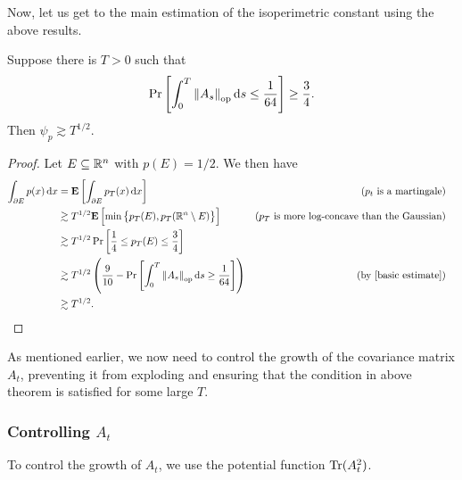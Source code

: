 		Now, let us get to the main estimation of the isoperimetric constant using the above results.

		\begin{ftheo}
			\label{lee-vem: isoperimetric using time}
			Suppose there is $T > 0$ such that
			\[ \Pr\left[\int_0^T \left\lVert A_s\right\rVert_{\text{op}} \operatorname{d}\!{s} \leq \frac{1}{64} \right] \geq \frac{3}{4}. \]
			Then $\psi_p \gtrsim T^{1/2}$.
		\end{ftheo}
		\begin{proof}
			Let $E\subseteq\mathbb{R}^n$ with $p(E) = 1/2$.
			We then have
			\begin{align*}
				\int_{\partial E} p(x) \d{x} &= \expec\left[ \int_{\partial E} p_T(x)\d{x} \right] & (p_t\text{ is a martingale}) \\
					&\gtrsim T^{1/2} \expec \left[ \min\left\{p_T(E) , p_T(\Rn\setminus E)\right\} \right] & \text{($p_T$ is more log-concave than the Gaussian)} \\
					&\gtrsim T^{1/2} \Pr\left[ \frac{1}{4} \leq p_T(E) \leq \frac{3}{4} \right] \\
					&\gtrsim T^{1/2} \left(\frac{9}{10} - \Pr\left[\int_0^T \opnorm{A_s}\d{s} \geq \frac{1}{64}\right]\right) & \text{(by \Cref{basic estimate})} \\
					&\gtrsim T^{1/2}. & & \qedhere
			\end{align*}
		\end{proof}

		As mentioned earlier, we now need to control the growth of the covariance matrix $A_t$, preventing it from exploding and ensuring that the condition in above theorem is satisfied for some large $T$.

	\subsubsection{Controlling \texorpdfstring{$A_t$}{At}}

		To control the growth of $A_t$, we use the potential function $\operatorname{Tr}(A_t^2)$.

